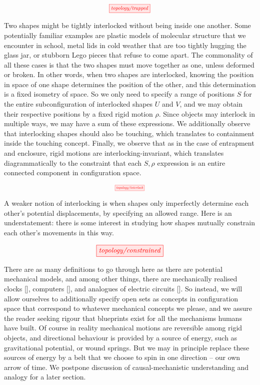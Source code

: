 \begin{fullwidth}
\[\scalebox{0.75}{\tikzfig{topology/trapped}}\]


Two shapes might be tightly interlocked without being inside one another. Some potentially familiar examples are plastic models of molecular structure that we encounter in school, metal lids in cold weather that are too tightly hugging the glass jar, or stubborn Lego pieces that refuse to come apart. The commonality of all these cases is that the two shapes must move together as one, unless deformed or broken. In other words, when two shapes are interlocked, knowing the position in space of one shape determines the position of the other, and this determination is a fixed isometry of space. So we only need to specify a range of positions $S$ for the entire subconfiguration of interlocked shapes $U$ and $V$, and we may obtain their respective positions by a fixed rigid motion $\rho$. Since objects may interlock in multiple ways, we may have a sum of these expressions. We additionally observe that interlocking shapes should also be touching, which translates to containment inside the touching concept. Finally, we observe that as in the case of entrapment and enclosure, rigid motions are interlocking-invariant, which translates diagrammatically to the constraint that each $S,\rho$ expression is an entire connected component in configuration space.

\[\scalebox{0.5}{\tikzfig{topology/interlock}}\]


A weaker notion of interlocking is when shapes only imperfectly determine each other's potential displacements, by specifying an allowed range. Here is an understatement: there is some interest in studying how shapes mutually constrain each other's movements in this way.

\[\tikzfig{topology/constrained}\]

There are as many definitions to go through here as there are potential mechanical models, and among other things, there are mechanically realised clocks [], computers [], and analogues of electric circuits []. So instead, we will allow ourselves to additionally specify open sets as concepts in configuration space that correspond to whatever mechanical concepts we please, and we assure the reader seeking rigour that blueprints exist for all the mechanisms humans have built. Of course in reality mechanical motions are reversible among rigid objects, and directional behaviour is provided by a source of energy, such as gravitational potential, or wound springs. But we may in principle replace these sources of energy by a belt that we choose to spin in one direction -- our own arrow of time. We postpone discussion of causal-mechanistic understanding and analogy for a later section.


\end{fullwidth}
